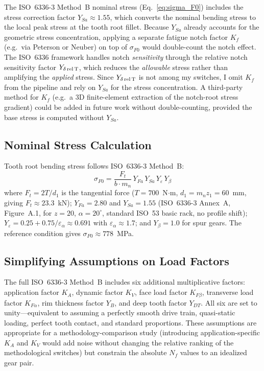 \documentclass[12pt,a4paper]{article}
\begin{document}
The ISO~6336-3 Method~B nominal stress (Eq.~\ref{eq:sigma_F0}) includes
the stress correction factor $Y_{Sa} \approx 1.55$, which converts the
nominal bending stress to the local peak stress at the tooth root
fillet. Because $Y_{Sa}$ already accounts for the geometric stress
concentration, applying a separate fatigue notch factor $K_f$ (e.g.\
via Peterson or Neuber) on top of $\sigma_{F0}$ would double-count the
notch effect. The ISO~6336 framework handles notch \emph{sensitivity}
through the relative notch sensitivity factor $Y_{\delta\,\rm rel\,T}$,
which reduces the \emph{allowable} stress rather than amplifying the
\emph{applied} stress. Since $Y_{\delta\,\rm rel\,T}$ is not among my
switches, I omit $K_f$ from the pipeline and rely on $Y_{Sa}$ for the
stress concentration. A third-party method for $K_f$ (e.g.\ a 3D
finite-element extraction of the notch-root stress gradient) could be
added in future work without double-counting, provided the base stress
is computed without $Y_{Sa}$.

\subsection{Nominal Stress Calculation}

Tooth root bending stress follows ISO~6336-3 Method~B:
\begin{equation}
\label{eq:sigma_F0}
\sigma_{F0} = \frac{F_t}{b \cdot m_n} \,
Y_{Fa} \, Y_{Sa} \, Y_\varepsilon \, Y_\beta
\end{equation}
where $F_t = 2T/d_1$ is the tangential force ($T=700$~N$\cdot$m,
$d_1 = m_n z_1 = 60$~mm, giving $F_t \approx 23.3$~kN);
$Y_{Fa}=2.80$ and $Y_{Sa}=1.55$ (ISO~6336-3 Annex~A, Figure~A.1,
for $z=20$, $\alpha=20^\circ$, standard ISO~53 basic rack, no profile
shift); $Y_\varepsilon = 0.25 + 0.75/\varepsilon_\alpha \approx 0.691$
with $\varepsilon_\alpha \approx 1.7$; and $Y_\beta = 1.0$ for spur
gears. The reference condition gives $\sigma_{F0} \approx 778$~MPa.

\subsection{Simplifying Assumptions on Load Factors}

The full ISO~6336-3 Method~B includes six additional multiplicative
factors: application factor $K_A$, dynamic factor $K_V$, face load
factor $K_{F\beta}$, transverse load factor $K_{F\alpha}$, rim
thickness factor $Y_B$, and deep tooth factor $Y_{DT}$. All six are set
to unity---equivalent to assuming a perfectly smooth drive train,
quasi-static loading, perfect tooth contact, and standard proportions.
These assumptions are appropriate for a methodology-comparison study
(introducing application-specific $K_A$ and $K_V$ would add noise
without changing the relative ranking of the methodological switches)
but constrain the absolute $N_f$ values to an idealized gear pair.
\end{document}

